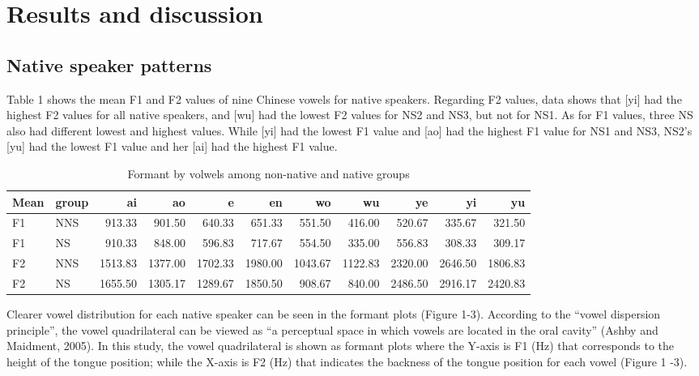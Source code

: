 \documentclass[man, fleqn, noextraspace]{apa6}
\begin{document}
\section{Results and discussion}\label{results-and-discussion}

\subsection{Native speaker patterns}\label{native-speaker-patterns}

Table 1 shows the mean F1 and F2 values of nine Chinese vowels for
native speakers. Regarding F2 values, data shows that {[}yi{]} had the
highest F2 values for all native speakers, and {[}wu{]} had the lowest
F2 values for NS2 and NS3, but not for NS1. As for F1 values, three NS
also had different lowest and highest values. While {[}yi{]} had the
lowest F1 value and {[}ao{]} had the highest F1 value for NS1 and NS3,
NS2's {[}yu{]} had the lowest F1 value and her {[}ai{]} had the highest
F1 value.

\begin{table}

\caption{\label{tab:table1}Formant by volwels among non-native and native groups}
\centering
\begin{tabular}[t]{llrrrrrrrrr}
\toprule
Mean & group & ai & ao & e & en & wo & wu & ye & yi & yu\\
\midrule
F1 & NNS & 913.33 & 901.50 & 640.33 & 651.33 & 551.50 & 416.00 & 520.67 & 335.67 & 321.50\\
F1 & NS & 910.33 & 848.00 & 596.83 & 717.67 & 554.50 & 335.00 & 556.83 & 308.33 & 309.17\\
F2 & NNS & 1513.83 & 1377.00 & 1702.33 & 1980.00 & 1043.67 & 1122.83 & 2320.00 & 2646.50 & 1806.83\\
F2 & NS & 1655.50 & 1305.17 & 1289.67 & 1850.50 & 908.67 & 840.00 & 2486.50 & 2916.17 & 2420.83\\
\bottomrule
\end{tabular}
\end{table}

Clearer vowel distribution for each native speaker can be seen in the
formant plots (Figure 1-3). According to the \enquote{vowel dispersion
principle}, the vowel quadrilateral can be viewed as \enquote{a
perceptual space in which vowels are located in the oral cavity} (Ashby
and Maidment, 2005). In this study, the vowel quadrilateral is shown as
formant plots where the Y-axis is F1 (Hz) that corresponds to the height
of the tongue position; while the X-axis is F2 (Hz) that indicates the
backness of the tongue position for each vowel (Figure 1 -3).
\end{document}
